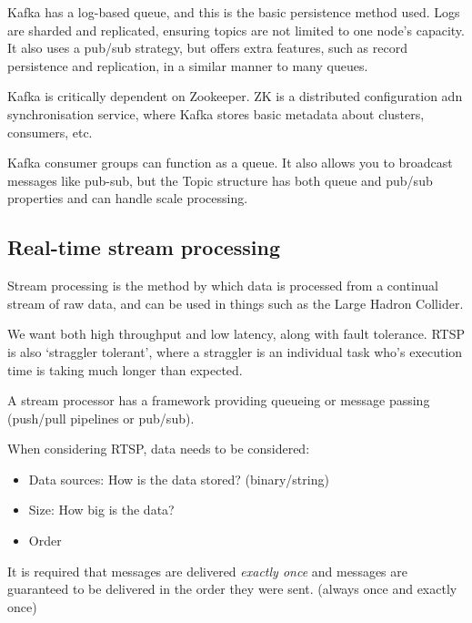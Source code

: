 \documentclass[11pt,a4paper,titlepage,dvipsnames,cmyk]{scrartcl}
\begin{document}
Kafka has a log-based queue, and this is the basic persistence method used. Logs are sharded and replicated, ensuring topics are not limited to one node's capacity. It also uses a pub/sub strategy, but offers extra features, such as record persistence and replication, in a similar manner to many queues.

Kafka is critically dependent on Zookeeper. ZK is a distributed configuration adn synchronisation service, where Kafka stores basic metadata about clusters, consumers, etc.

Kafka consumer groups can function as a queue. It also allows you to broadcast messages like pub-sub, but the Topic structure has both queue and pub/sub properties and can handle scale processing.

\subsection{Real-time stream processing}
Stream processing is the method by which data is processed from a continual stream of raw data, and can be used in things such as the Large Hadron Collider.

We want both high throughput and low latency, along with fault tolerance. RTSP is also `straggler tolerant', where a straggler is an individual task who's execution time is taking much longer than expected.

A stream processor has a framework providing queueing or message passing (push/pull pipelines or pub/sub).

When considering RTSP, data needs to be considered:
\begin{itemize}
    \item Data sources: How is the data stored? (binary/string)
    \item Size: How big is the data?
    \item Order
\end{itemize}

It is required that messages are delivered \textit{exactly once} and messages are guaranteed to be delivered in the order they were sent. (always once and exactly once)
\end{document}
